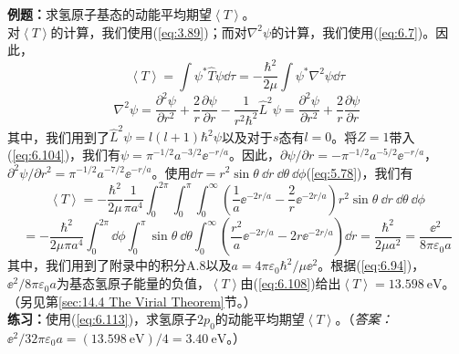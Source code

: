     \begin{examplebox}
        \textbf{例题：}求氢原子基态的动能平均期望$\left\langle T \right\rangle$。
        \\

        对$\left\langle T \right\rangle$的计算，我们使用(\ref{eq:3.89})；而对$\nabla^2\psi$的计算，我们使用(\ref{eq:6.7})。因此，
        \begin{equation*}
            \left\langle T \right\rangle = \int\psi^{\ast}\hat{T}\psi\dd \tau = -\frac{\hbar^2}{2\mu}\int\psi^{\ast}\nabla^2\psi\dd \tau
        \end{equation*}
        \begin{equation*}
            \nabla^2\psi = \frac{\partial^2\psi}{\partial r^2} + \frac{2}{r}\frac{\partial\psi}{\partial r} - \frac{1}{r^2\hbar^2}\hat{L}^2\psi = \frac{\partial^2\psi}{\partial r^2} + \frac{2}{r}\frac{\partial\psi}{\partial r}
        \end{equation*}
        其中，我们用到了$\hat{L}^2\psi = l\left(l+1\right)\hbar^2\psi$以及对于$s$态有$l=0$。将$Z=1$带入(\ref{eq:6.104})，我们有$\psi = \pi^{-1/2}a^{-3/2}\ee ^{-r/a}$。因此，$\partial\psi/\partial r = -\pi^{-1/2}a^{-5/2}\ee ^{-r/a}$，$\partial^2\psi/\partial r^2 = \pi^{-1/2}a^{-7/2}\ee ^{-r/a}$。使用$\dd \tau = r^2\sin\theta\:\dd r\:\dd \theta\:\dd \phi$(\ref{eq:5.78})，我们有
        \begin{equation*}
            \left\langle T \right\rangle = -\frac{\hbar^2}{2\mu}\frac{1}{\pi a^4}\int_{0}^{2\pi}\int_{0}^{\pi}\int_{0}^{\infty}\left(\frac{1}{a}\ee ^{-2r/a} - \frac{2}{r}\ee ^{-2r/a}\right)r^2\sin\theta\:\dd r\:\dd \theta\:\dd \phi
        \end{equation*}
        \begin{equation*}
            = -\frac{\hbar^2}{2\mu\pi a^4}\int_{0}^{2\pi}\dd \phi\int_{0}^{\pi}\sin\theta\:\dd \theta\int_{0}^{\infty}\left(\frac{r^2}{a}\ee ^{-2r/a} - 2r\ee ^{-2r/a}\right)\dd r = \frac{\hbar^2}{2\mu a^2} = \frac{\ee ^2}{8\pi\varepsilon_0a}
        \end{equation*}
        其中，我们用到了附录中的积分A.8以及$a = 4\pi\varepsilon_0\hbar^2/\mu\ee ^2$。根据(\ref{eq:6.94})，$\ee ^2/8\pi\varepsilon_0a$为基态氢原子能量的负值，$\left\langle T \right\rangle$由(\ref{eq:6.108})给出$\left\langle T \right\rangle = 13.598 \: \mathrm{eV}$。（另见第\ref{sec:14.4 The Virial Theorem}节。）
        \\

        \textbf{练习：}使用(\ref{eq:6.113})，求氢原子$2p_0$的动能平均期望$\left\langle T \right\rangle$。（\textit{答案：}$\ee ^2/32\pi\varepsilon_0a = \left(13.598 \: \mathrm{eV}\right) /4 = 3.40 \: \mathrm{eV}$。）
    \end{examplebox}

